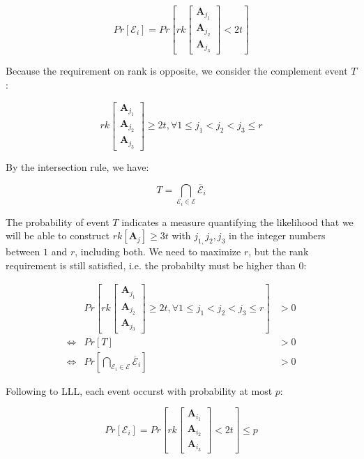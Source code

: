 \[
Pr\left[\mathcal{E}_{i}\right]=Pr\left[rk\left[\begin{array}{c}
\boldsymbol{A}_{j_{1}}\\
\boldsymbol{A}_{j_{2}}\\
\boldsymbol{A}_{j_{3}}
\end{array}\right]<2t\right]
\]

Because the requirement on rank is opposite, we consider the complement
event $T$:

\[
rk\left[\begin{array}{c}
\boldsymbol{A}_{j_{1}}\\
\boldsymbol{A}_{j_{2}}\\
\boldsymbol{A}_{j_{3}}
\end{array}\right]\geq2t,\forall1\leq j_{1}<j_{2}<j_{3}\leq r
\]

By the intersection rule, we have:

\[
T=\underset{\mathcal{E}_{i}\in\mathcal{E}}{\bigcap}\overline{\mathcal{E}}_{i}
\]

The probability of event $T$ indicates a measure quantifying the
likelihood that we will be able to construct $rk\left[\boldsymbol{A}_{j}\right]\geq3t$
with $j_{1,}j_{2},j_{3}$ in the integer numbers between $1$ and
$r$, including both. We need to maximize $r$, but the rank requirement
is still satisfied, i.e. the probabilty must be higher than $0$:

\begin{eqnarray*}
 & Pr\left[rk\left[\begin{array}{c}
\boldsymbol{A}_{j_{1}}\\
\boldsymbol{A}_{j_{2}}\\
\boldsymbol{A}_{j_{3}}
\end{array}\right]\geq2t,\forall1\leq j_{1}<j_{2}<j_{3}\leq r\right] & >0\\
\Leftrightarrow & Pr\left[T\right] & >0\\
\Leftrightarrow & Pr\left[\underset{\mathcal{E}_{i}\in\mathcal{E}}{\bigcap}\overline{\mathcal{E}}_{i}\right] & >0
\end{eqnarray*}

Following to LLL, each event occurst with probability at most $p$:

\[
Pr\left[\mathcal{E}_{i}\right]=Pr\left[rk\left[\begin{array}{c}
\boldsymbol{A}_{i_{1}}\\
\boldsymbol{A}_{i_{2}}\\
\boldsymbol{A}_{i_{3}}
\end{array}\right]<2t\right]\leq p
\]

